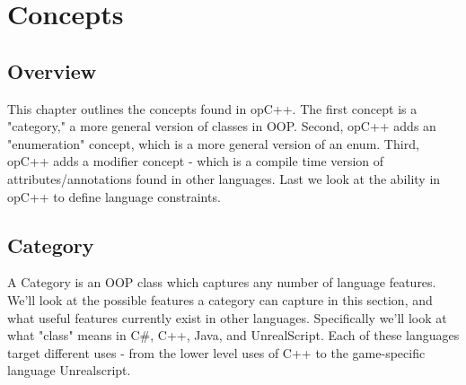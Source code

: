 
\chapter{Concepts}
\label{chap:concepts}

\begin{comment}
note: the challenge here is to get the reader (and us) to think
of these things not in terms of the implementation, but in terms 
of concepts and new ways of thinking about code.
\end{comment}

\begin{comment}
note: I think a good way of looking at opC++ concepts, is a widening
of definitions to enable capturing features from other languages.
Then look at it as giving you the ability to constrain these wide
definitions into usable and specific constructs.  Yes this is what
the approach should read like - I think we have a tendency to say
that it captures all features - but it just enables capturing some
features, and it will improve as the tool evolves.
\end{comment}

\section{ Overview }
\label{sec:concepts_overview}

This chapter outlines the concepts found in opC++.  The
first concept is a "category," a more general version
of classes in OOP.  Second, opC++ adds an "enumeration" concept,
which is a more general version of an enum.  Third, opC++
adds a modifier concept - which is a compile time version of
attributes/annotations found in other languages.  
Last we look at the ability in opC++ to define language constraints.

\section{ Category }
\label{sec:concepts_category}

A Category is an OOP class which captures any number of 
language features.  We'll look at the possible features
a category can capture in this section, and what useful
features currently exist in other languages.  Specifically
we'll look at what "class" means in C\#, C++, Java, and UnrealScript.
Each of these languages target different uses - from the lower level
uses of C++ to the game-specific language Unrealscript.


